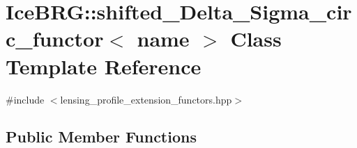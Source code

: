\hypertarget{classIceBRG_1_1shifted__Delta__Sigma__circ__functor}{}\section{Ice\+B\+R\+G\+:\+:shifted\+\_\+\+Delta\+\_\+\+Sigma\+\_\+circ\+\_\+functor$<$ name $>$ Class Template Reference}
\label{classIceBRG_1_1shifted__Delta__Sigma__circ__functor}


{\ttfamily \#include $<$lensing\+\_\+profile\+\_\+extension\+\_\+functors.\+hpp$>$}

\subsection*{Public Member Functions}

